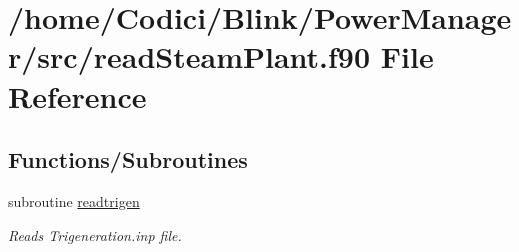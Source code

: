 \hypertarget{read_steam_plant_8f90}{\section{/home/\-Codici/\-Blink/\-Power\-Manager/src/read\-Steam\-Plant.f90 File Reference}
\label{read_steam_plant_8f90}
}
\subsection*{Functions/\-Subroutines}
\begin{DoxyCompactItemize}
\item 
subroutine \hyperlink{read_steam_plant_8f90_a2048dd756a11560009d65015dc03f317}{readtrigen}
\begin{DoxyCompactList}\small\item\em Reads Trigeneration.\-inp file. \end{DoxyCompactList}\end{DoxyCompactItemize}


